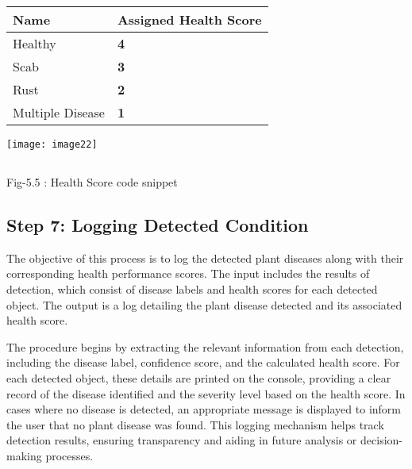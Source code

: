 \documentclass{book} %
\begin{document}
\noindent \textbf{}

\begin{tabular}{|p{2.2in}|p{2.2in}|} \hline 
\textbf{Name} & \textbf{Assigned Health Score} \\ \hline 
Healthy \textbf{} & \textbf{4} \\ \hline 
Scab \textbf{} & \textbf{3} \\ \hline 
Rust \textbf{} & \textbf{2} \\ \hline 
Multiple Disease\textbf{} & \textbf{1} \\ \hline 
\end{tabular}

\textbf{}

\noindent \texttt{[image: image22]}

\noindent 

\noindent 
\subsection{}

\noindent 







Fig-5.5 :  Health Score code snippet

\noindent 
\subsection{}

\noindent 
\subsection{}

\noindent 
\subsection{Step 7: Logging Detected Condition }

\noindent The objective of this process is to log the detected plant diseases along with their corresponding health performance scores. The input includes the results of detection, which consist of disease labels and health scores for each detected object. The output is a log detailing the plant disease detected and its associated health score.

\noindent The procedure begins by extracting the relevant information from each detection, including the disease label, confidence score, and the calculated health score. For each detected object, these details are printed on the console, providing a clear record of the disease identified and the severity level based on the health score. In cases where no disease is detected, an appropriate message is displayed to inform the user that no plant disease was found. This logging mechanism helps track detection results, ensuring transparency and aiding in future analysis or decision-making processes.
\end{document}
